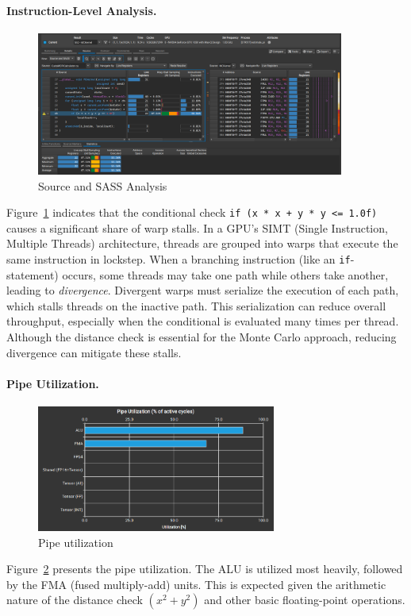 \documentclass[12pt]{article}
\begin{document}
\paragraph{Instruction-Level Analysis.}
\begin{figure}[ht]
      \centering
      \includegraphics[width=0.9\textwidth]{images/warp-stalls.png}
      \caption{Source and SASS Analysis}\label{fig:kernel-instructions}
\end{figure}
Figure~\ref{fig:kernel-instructions} indicates that the conditional check
\texttt{if (x * x + y * y <= 1.0f)} causes a significant share of warp stalls.
In a GPU’s SIMT (Single Instruction, Multiple Threads) architecture, threads
are grouped into warps that execute the same instruction in lockstep. When a
branching instruction (like an \texttt{if}-statement) occurs, some threads may
take one path while others take another, leading to \emph{divergence}. Divergent
warps must serialize the execution of each path, which stalls threads on the
inactive path. This serialization can reduce overall throughput, especially
when the conditional is evaluated many times per thread. Although the distance
check is essential for the Monte Carlo approach, reducing divergence can mitigate
these stalls.

\paragraph{Pipe Utilization.}
\begin{figure}[ht]
      \centering
      \includegraphics[width=0.7\textwidth]{images/pipe-utilization.png}
      \caption{Pipe utilization}\label{fig:pipe-util}
\end{figure}
Figure~\ref{fig:pipe-util} presents the pipe utilization. The ALU is utilized
most heavily, followed by the FMA (fused multiply-add) units. This is expected
given the arithmetic nature of the distance check \((x^2 + y^2)\) and other
basic floating-point operations.
\end{document}
